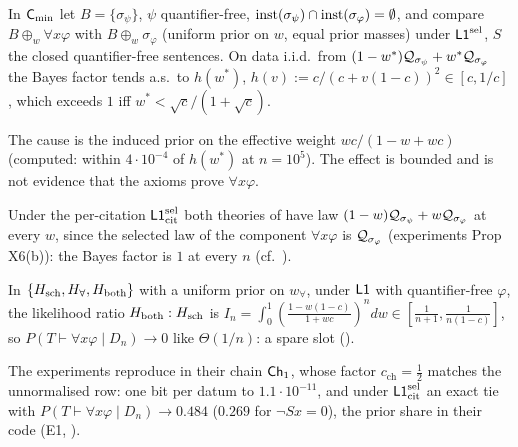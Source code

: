 \begin{proposition}\label{prop:univ:B2}
In $\mathsf{C}_{\min}$ let $B=\{\sigma_\psi\}$, $\psi$ quantifier-free, $\mathrm{inst}(\sigma_\psi)\cap\mathrm{inst}(\sigma_\varphi)=\emptyset$, and compare $B\oplus_w\forall x\varphi$ with $B\oplus_w\sigma_\varphi$ (uniform prior on $w$, equal prior masses) under $\mathord{\mathsf{L1}}^{\mathrm{sel}}$, $S$ the closed quantifier-free sentences. On data i.i.d.\ from $(1-w^*)\mathcal{Q}_{\sigma_\psi}+w^*\mathcal{Q}_{\sigma_\varphi}$ the Bayes factor tends a.s.\ to $h(w^*)$, $h(v):=c/(c+v(1-c))^2\in[c,1/c]$, which exceeds $1$ iff $w^*<\sqrt c/(1+\sqrt c)$.
\end{proposition}

\noindent The cause is the induced prior on the effective weight $wc/(1-w+wc)$ (computed: within $4\cdot10^{-4}$ of $h(w^*)$ at $n=10^5$). The effect is bounded and is not evidence that the axioms prove $\forall x\varphi$.

\begin{remark}\label{rem:univ:B2cit}
Under the per-citation $\mathord{\mathsf{L1}}^{\mathrm{sel}}_{\mathrm{cit}}$ both theories of  have law $(1-w)\mathcal{Q}_{\sigma_\psi}+w\mathcal{Q}_{\sigma_\varphi}$ at every $w$, since the selected law of the component $\forall x\varphi$ is $\mathcal{Q}_{\sigma_\varphi}$ (experiments Prop X6(b)): the Bayes factor is $1$ at every $n$ (cf.\ ).
\end{remark}

\begin{proposition}\label{prop:univ:both}
In $\{H_{\mathrm{sch}},H_{\forall},H_{\mathrm{both}}\}$ with a uniform prior on $w_\forall$, under $\mathord{\mathsf{L1}}$ with quantifier-free $\varphi$, the likelihood ratio $H_{\mathrm{both}}:H_{\mathrm{sch}}$ is $I_n=\int_0^1(\frac{1-w(1-c)}{1+wc})^ndw\in[\frac1{n+1},\frac1{n(1-c)}]$, so $P(T\vdash\forall x\varphi\mid D_n)\to0$ like $\Theta(1/n)$: a spare slot ().
\end{proposition}

The experiments reproduce  in their chain $\mathsf{Ch}_{1}$, whose factor $c_{\mathrm{ch}}=\tfrac12$ matches the unnormalised row: one bit per datum to $1.1\cdot10^{-11}$, and under $\mathord{\mathsf{L1}}^{\mathrm{sel}}_{\mathrm{cit}}$ an exact tie with $P(T\vdash\forall x\varphi\mid D_n)\to0.484$ ($0.269$ for $\neg Sx=0$), the prior share in their code (E1, ).

